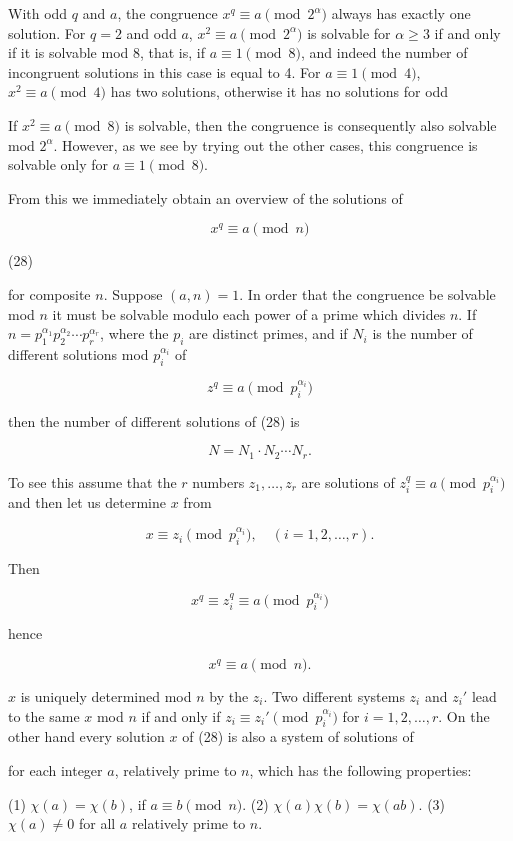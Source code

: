 With odd $q$ and $a$, the congruence $x^q \equiv a \pmod{2^\alpha}$ always has exactly one solution. For $q = 2$ and odd $a$, $x^2 \equiv a \pmod{2^\alpha}$ is solvable for $\alpha \geq 3$ if and only if it is solvable mod 8, that is, if $a \equiv 1 \pmod{8}$, and indeed the number of incongruent solutions in this case is equal to 4. For $a \equiv 1 \pmod{4}$, $x^2 \equiv a \pmod{4}$ has two solutions, otherwise it has no solutions for odd

If $x^2 \equiv a \pmod{8}$ is solvable, then the congruence is consequently also solvable mod $2^\alpha$. However, as we see by trying out the other cases, this congruence is solvable only for $a \equiv 1 \pmod{8}$.

From this we immediately obtain an overview of the solutions of

$$x^q \equiv a \pmod{n}$$

(28)

for composite $n$. Suppose $(a, n) = 1$. In order that the congruence be solvable mod $n$ it must be solvable modulo each power of a prime which divides $n$. If $n = p_1^{\alpha_1} p_2^{\alpha_2} \cdots p_r^{\alpha_r}$, where the $p_i$ are distinct primes, and if $N_i$ is the number of different solutions mod $p_i^{\alpha_i}$ of

$$z^q \equiv a \pmod{p_i^{\alpha_i}}$$

then the number of different solutions of (28) is

$$N = N_1 \cdot N_2 \cdots N_r.$$

To see this assume that the $r$ numbers $z_1, \ldots, z_r$ are solutions of $z_i^q \equiv a \pmod{p_i^{\alpha_i}}$ and then let us determine $x$ from

$$x \equiv z_i \pmod{p_i^{\alpha_i}}, \quad (i = 1, 2, \ldots, r).$$

Then

$$x^q \equiv z_i^q \equiv a \pmod{p_i^{\alpha_i}}$$

hence

$$x^q \equiv a \pmod{n}.$$

$x$ is uniquely determined mod $n$ by the $z_i$. Two different systems $z_i$ and $z_i'$ lead to the same $x$ mod $n$ if and only if $z_i \equiv z_i' \pmod{p_i^{\alpha_i}}$ for $i = 1, 2, \ldots, r$. On the other hand every solution $x$ of (28) is also a system of solutions of

for each integer $a$, relatively prime to $n$, which has the following properties:

(1) $\chi(a) = \chi(b)$, if $a \equiv b \pmod{n}$.
(2) $\chi(a)\chi(b) = \chi(ab)$.
(3) $\chi(a) \neq 0$ for all $a$ relatively prime to $n$.

